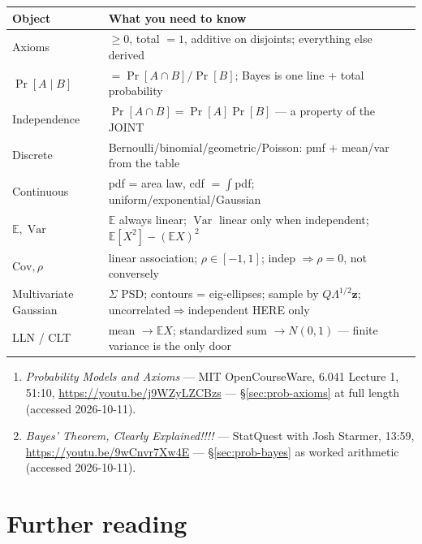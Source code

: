 \begin{center}
\begin{tabularx}{\textwidth}{l>{\raggedright\arraybackslash}X}
\toprule
\textbf{Object} & \textbf{What you need to know}\\
\midrule
Axioms & $\ge0$, total $=1$, additive on disjoints; everything else
derived \\
$\Pr[A\mid B]$ & $=\Pr[A\cap B]/\Pr[B]$; Bayes is one line + total
probability \\
Independence & $\Pr[A\cap B]=\Pr[A]\Pr[B]$ --- a property of the JOINT
\\
Discrete & Bernoulli/binomial/geometric/Poisson: pmf + mean/var from the
table \\
Continuous & pdf = area law, cdf $=\int$pdf; uniform/exponential/Gaussian
\\
$\mathbb E,\operatorname{Var}$ & $\mathbb E$ always linear;
$\operatorname{Var}$ linear only when independent; $\mathbb
E[X^2]-(\mathbb E X)^2$ \\
$\mathrm{Cov},\rho$ & linear association; $\rho\in[-1,1]$; indep
$\Rightarrow\rho=0$, not conversely \\
Multivariate Gaussian & $\Sigma$ PSD; contours = eig-ellipses; sample by
$Q\Lambda^{1/2}\mathbf z$; uncorrelated$\Rightarrow$independent HERE only
\\
LLN / CLT & mean $\to\mathbb EX$; standardized sum $\to N(0,1)$ ---
finite variance is the only door \\
\bottomrule
\end{tabularx}
\end{center}
\begin{rulebox}
\begin{enumerate}
\item \emph{Probability Models and Axioms} --- MIT OpenCourseWare,
6.041 Lecture 1, 51:10, \url{https://youtu.be/j9WZyLZCBzs} ---
\S\ref{sec:prob-axioms} at full length (accessed 2026-10-11).
\item \emph{Bayes' Theorem, Clearly Explained!!!!} --- StatQuest with
Josh Starmer, 13:59, \url{https://youtu.be/9wCnvr7Xw4E} ---
\S\ref{sec:prob-bayes} as worked arithmetic (accessed 2026-10-11).
\end{enumerate}
\end{rulebox}

\section*{Further reading}

